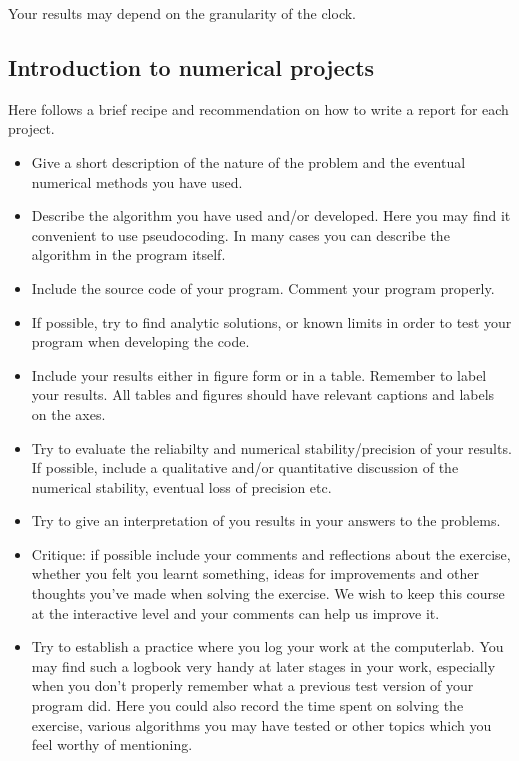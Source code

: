 \documentclass[%
oneside,                 %
final,                   %
10pt]{article}
\begin{document}
Your results may depend on the granularity of the clock.




\subsection*{Introduction to numerical projects}

Here follows a brief recipe and recommendation on how to write a report for each
project.

\begin{itemize}
  \item Give a short description of the nature of the problem and the eventual  numerical methods you have used.

  \item Describe the algorithm you have used and/or developed. Here you may find it convenient to use pseudocoding. In many cases you can describe the algorithm in the program itself.

  \item Include the source code of your program. Comment your program properly.

  \item If possible, try to find analytic solutions, or known limits in order to test your program when developing the code.

  \item Include your results either in figure form or in a table. Remember to        label your results. All tables and figures should have relevant captions        and labels on the axes.

  \item Try to evaluate the reliabilty and numerical stability/precision of your results. If possible, include a qualitative and/or quantitative discussion of the numerical stability, eventual loss of precision etc.

  \item Try to give an interpretation of you results in your answers to  the problems.

  \item Critique: if possible include your comments and reflections about the  exercise, whether you felt you learnt something, ideas for improvements and  other thoughts you've made when solving the exercise. We wish to keep this course at the interactive level and your comments can help us improve it.

  \item Try to establish a practice where you log your work at the  computerlab. You may find such a logbook very handy at later stages in your work, especially when you don't properly remember  what a previous test version  of your program did. Here you could also record  the time spent on solving the exercise, various algorithms you may have tested or other topics which you feel worthy of mentioning.
\end{itemize}
\end{document}
